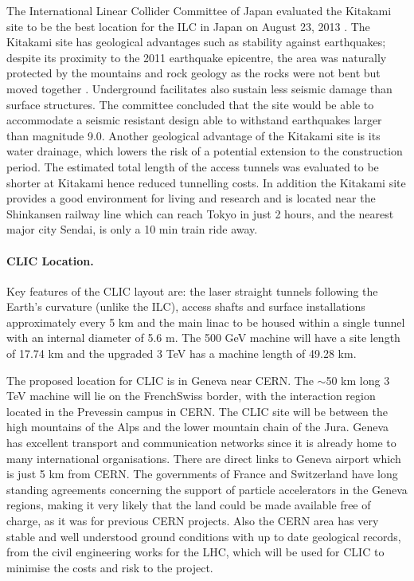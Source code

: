 The International Linear Collider Committee of Japan evaluated the Kitakami site to be the best location for the ILC in Japan on August 23, 2013 \cite{LCC:Press3}. The Kitakami site has geological advantages such as stability against earthquakes; despite its proximity to the 2011 earthquake epicentre, the area was naturally protected by the mountains and rock geology as the rocks were not bent but moved together \cite{Japan}. Underground facilitates also sustain less seismic damage than surface structures. The committee concluded that the site would be able to accommodate a seismic resistant design able to withstand earthquakes larger than magnitude 9.0. Another geological advantage of the Kitakami site is its water drainage, which lowers the risk of a potential extension to the construction period. The estimated total length of the access tunnels was evaluated to be shorter at Kitakami hence reduced tunnelling costs. In addition \cite{ILC:FundingAgencies} the Kitakami site provides a good environment for living and research and is located near the Shinkansen railway line which can reach Tokyo in just 2 hours, and the nearest major city Sendai, is only a 10 min train ride away.

\paragraph{CLIC Location.}

Key features of the CLIC layout are: the laser straight tunnels following the Earth's curvature (unlike the ILC), access shafts and surface installations approximately every 5 km and the main linac to be housed within a single tunnel with an internal diameter of 5.6 m. The 500 GeV machine will have a site length of 17.74 km and the upgraded 3 TeV has a machine length of 49.28 km. \cite{CLIC:Concept}

The proposed location for CLIC is in Geneva near CERN. The $\sim$50 km long 3 TeV machine will lie on the French\textendash Swiss border, with the interaction region located in the Prevessin campus in CERN. The CLIC site will be between the high mountains of the Alps and the lower mountain chain of the Jura. Geneva has excellent transport and communication networks since it is already home to many international organisations. There are direct links to Geneva airport which is just 5 km from CERN. The governments of France and Switzerland have long standing agreements concerning the support of particle accelerators in the Geneva regions, making it very likely that the land could be made available free of charge, as it was for previous CERN projects. Also the CERN area has very stable and well understood ground conditions with up to date geological records, from the civil engineering works for the LHC, which will be used for CLIC to minimise the costs and risk to the project.

